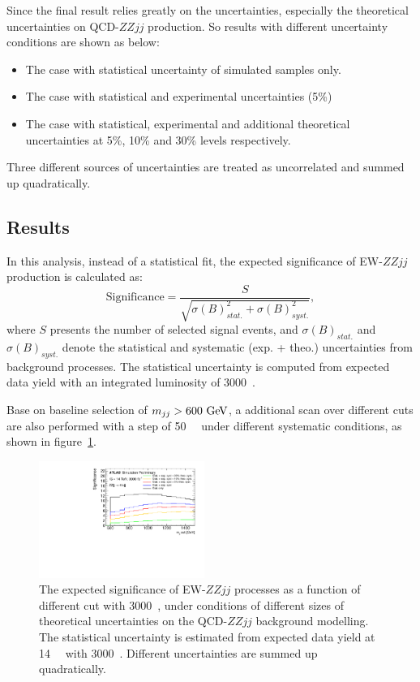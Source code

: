 Since the final result relies greatly on the uncertainties, especially the theoretical uncertainties on QCD-$ZZjj$ production.
So results with different uncertainty conditions are shown as below:
\begin{itemize}
	\item The case with statistical uncertainty of simulated samples only.
	\item The case with statistical and experimental uncertainties (5\%)
	\item The case with statistical, experimental and additional theoretical uncertainties at 5\%, 10\% and 30\% levels respectively.
\end{itemize}
Three different sources of uncertainties are treated as uncorrelated and summed up quadratically.

\subsection{Results}

In this analysis, instead of a statistical fit, the expected significance of EW-$ZZjj$ production is calculated as:
\begin{equation}
  \text{Significance} = \frac{S}{\sqrt{\sigma(B)_{stat.}^2 + \sigma(B)_{syst.}^2}},
\end{equation}
where $S$ presents the number of selected signal events,
and $\sigma(B)_{stat.}$ and $\sigma(B)_{syst.}$ denote the statistical and systematic (exp. + theo.) uncertainties from background processes.
The statistical uncertainty is computed from expected data yield with an integrated luminosity of 3000~\ifb.

Base on baseline selection of $m_{jj} > 600~\text{Ge\kern -0.1em V}$, a additional scan over different \mjj cuts are also performed with a step of 50~\gev~
under different systematic conditions, as shown in figure~\ref{fig:mjj_scan}.
\begin{figure}[!htbp]
\centering
\includegraphics[width=0.48\textwidth]{figures/VBSZZ/hllhc/significance_noshape_0_noratio.pdf}
\caption{
The expected significance of EW-$ZZjj$ processes as a function of different \mjj cut with 3000~\ifb,
under conditions of different sizes of theoretical uncertainties on the QCD-$ZZjj$ background modelling.
The statistical uncertainty is estimated from expected data yield at 14~\tev~ with 3000~\ifb.
Different uncertainties are summed up quadratically.
}
\label{fig:mjj_scan}
\end{figure}

